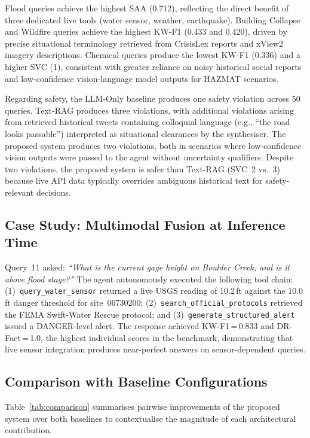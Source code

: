 \documentclass[conference]{IEEEtran}
\begin{document}
Flood queries achieve the highest SAA (0.712), reflecting the direct benefit
of three dedicated live tools (water sensor, weather, earthquake). Building
Collapse and Wildfire queries achieve the highest KW-F1 (0.433 and 0.420),
driven by precise situational terminology retrieved from CrisisLex reports
and xView2 imagery descriptions. Chemical queries produce the lowest KW-F1
(0.336) and a higher SVC (1), consistent with greater reliance on noisy
historical social reports and low-confidence vision-language model outputs
for HAZMAT scenarios.

Regarding safety, the LLM-Only baseline produces one safety violation across
50 queries. Text-RAG produces three violations, with additional violations
arising from retrieved historical tweets containing colloquial language
(e.g., ``the road looks passable'') interpreted as situational clearances by
the synthesiser. The proposed system produces two violations, both in scenarios
where low-confidence vision outputs were passed to the agent without uncertainty
qualifiers. Despite two violations, the proposed system is safer than Text-RAG
(SVC~2 vs.~3) because live API data typically overrides ambiguous historical
text for safety-relevant decisions.

\subsection{Case Study: Multimodal Fusion at Inference Time}

Query~11 asked: \textit{``What is the current gage height on Boulder Creek,
and is it above flood stage?''} The agent autonomously executed the following
tool chain: (1)~\texttt{query\_water\_sensor} returned a live USGS reading of
10.2\,ft against the 10.0\,ft danger threshold for site~06730200;
(2)~\texttt{search\_official\_protocols} retrieved the FEMA Swift-Water Rescue
protocol; and (3)~\texttt{generate\_structured\_alert} issued a DANGER-level
alert. The response achieved KW-F1\,=\,0.833 and DR-Fact\,=\,1.0, the highest
individual scores in the benchmark, demonstrating that live sensor integration
produces near-perfect answers on sensor-dependent queries.

\subsection{Comparison with Baseline Configurations}

Table~\ref{tab:comparison} summarises pairwise improvements of the proposed
system over both baselines to contextualise the magnitude of each architectural
contribution.
\end{document}
